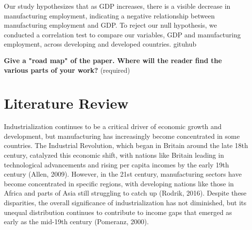\documentclass[12pt]{article}
\begin{document}
Our study hypothesizes that as GDP increases, there is a visible decrease in manufacturing employment, indicating a negative relationship between manufacturing employment and GDP. To reject our null hypothesis, we conducted a correlation test to compare our variables, GDP and manufacturing employment, across developing and developed countries. 
gituhub 

\textbf{Give a "road map" of the paper. Where will the reader find the various parts of your work?} (required)


\section{Literature Review} \label{sec:literature}



Industrialization continues to be a critical driver of economic growth and development, but manufacturing has increasingly become concentrated in some countries. The Industrial Revolution, which began in Britain around the late 18th century, catalyzed this economic shift, with nations like Britain leading in technological advancements and rising per capita incomes by the early 19th century (Allen, 2009). However, in the 21st century, manufacturing sectors have become concentrated in specific regions, with developing nations like those in Africa and parts of Asia still struggling to catch up (Rodrik, 2016). Despite these disparities, the overall significance of industrialization has not diminished, but its unequal distribution continues to contribute to income gaps that emerged as early as the mid-19th century (Pomeranz, 2000).
\end{document}
